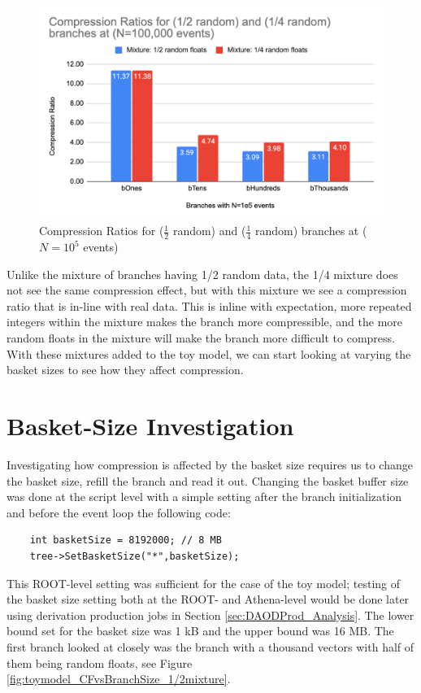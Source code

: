 \begin{figure}[h]
    \centering
    \includegraphics[width=.8\textwidth]{content/toymodel_content/Compression Ratios for (1_2 random) and (1_4 random) branches at (N=100,000 events).png}
    \caption{Compression Ratios for ($\frac{1}{2}$ random) and ($\frac{1}{4}$ random) branches at ($N=10^5$ events)}
    \label{fig:toymodel_compF_1e5_mix_random}
\end{figure}

Unlike the mixture of branches having 1/2 random data, the 1/4 mixture does not see the same compression effect, but with this mixture we see a compression ratio that is in-line with real data.
This is inline with expectation, more repeated integers within the mixture makes the branch more compressible, and the more random floats in the mixture will make the branch more difficult to compress.
With these mixtures added to the toy model, we can start looking at varying the basket sizes to see how they affect compression.

\section{Basket-Size Investigation}
\label{sec: toy-model basket-size investigation}

Investigating how compression is affected by the basket size requires us to change the basket size, refill the branch and read it out.
Changing the basket buffer size was done at the script level with a simple setting after the branch initialization and before the event loop the following code:
\begin{lstlisting}
    int basketSize = 8192000; // 8 MB
    tree->SetBasketSize("*",basketSize);
\end{lstlisting}
This ROOT-level setting was sufficient for the case of the toy model; testing of the basket size setting both at the ROOT- and Athena-level would be done later using derivation production jobs in Section \ref{sec:DAODProd_Analysis}.
The lower bound set for the basket size was 1 kB and the upper bound was 16 MB.
The first branch looked at closely was the branch with a thousand vectors with half of them being random floats, see Figure \ref{fig:toymodel_CFvsBranchSize_1/2mixture}.

